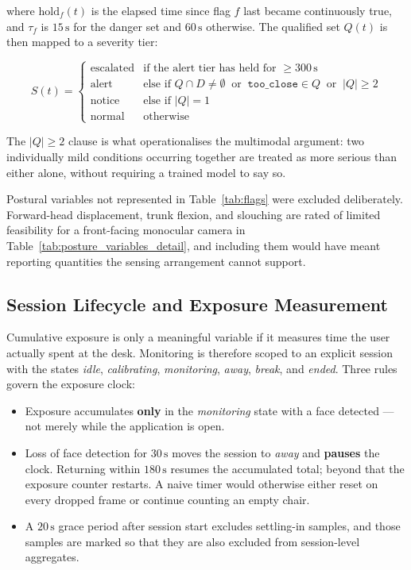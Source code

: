 where $\text{hold}_f(t)$ is the elapsed time since flag $f$ last became continuously true, and
$\tau_f$ is $15\,\text{s}$ for the danger set and $60\,\text{s}$ otherwise. The qualified set $Q(t)$
is then mapped to a severity tier:

\begin{equation}
S(t) =
\begin{cases}
\text{escalated} & \text{if the alert tier has held for } \geq 300\,\text{s} \\
\text{alert}     & \text{else if } Q \cap D \neq \emptyset \ \text{ or } \ \texttt{too\_close} \in Q \ \text{ or } \ |Q| \geq 2 \\
\text{notice}    & \text{else if } |Q| = 1 \\
\text{normal}    & \text{otherwise}
\end{cases}
\label{eq:severity}
\end{equation}

The $|Q| \geq 2$ clause is what operationalises the multimodal argument: two individually mild
conditions occurring together are treated as more serious than either alone, without requiring a
trained model to say so.

Postural variables not represented in Table~\ref{tab:flags} were excluded deliberately.
Forward-head displacement, trunk flexion, and slouching are rated of limited feasibility for a
front-facing monocular camera in Table~\ref{tab:posture_variables_detail}, and including them would
have meant reporting quantities the sensing arrangement cannot support.

\subsection{Session Lifecycle and Exposure Measurement}
\label{subsec:session}

Cumulative exposure is only a meaningful variable if it measures time the user actually spent at
the desk. Monitoring is therefore scoped to an explicit session with the states
\textit{idle}, \textit{calibrating}, \textit{monitoring}, \textit{away}, \textit{break}, and
\textit{ended}. Three rules govern the exposure clock:

\begin{itemize}
    \item Exposure accumulates \textbf{only} in the \textit{monitoring} state with a face detected
    --- not merely while the application is open.
    \item Loss of face detection for $30\,\text{s}$ moves the session to \textit{away} and
    \textbf{pauses} the clock. Returning within $180\,\text{s}$ resumes the accumulated total;
    beyond that the exposure counter restarts. A naive timer would otherwise either reset on every
    dropped frame or continue counting an empty chair.
    \item A $20\,\text{s}$ grace period after session start excludes settling-in samples, and those
    samples are marked so that they are also excluded from session-level aggregates.
\end{itemize}

